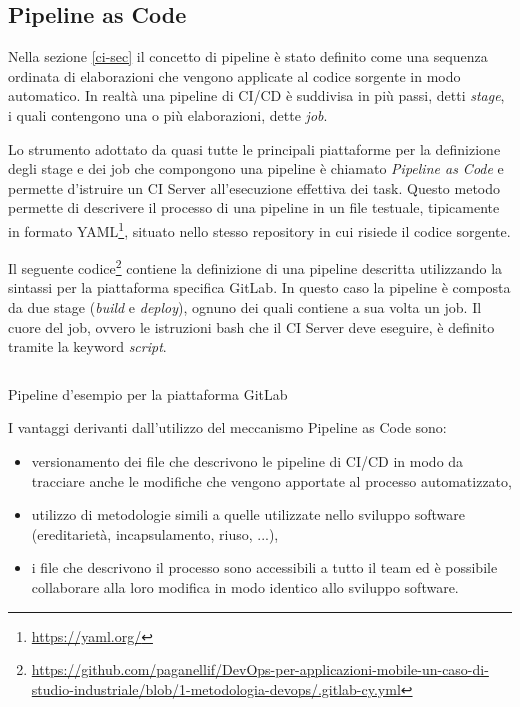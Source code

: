 \subsection{Pipeline as Code}
Nella sezione \ref{ci-sec} il concetto di pipeline è stato definito come una sequenza ordinata di elaborazioni che vengono applicate al codice sorgente in modo automatico. 
In realtà una pipeline di CI/CD è suddivisa in più passi, 
detti \textit{stage}, 
i quali contengono una o più elaborazioni, 
dette \textit{job}.

Lo strumento adottato da quasi tutte le principali piattaforme per la definizione degli stage e dei job che compongono una pipeline è chiamato \textit{Pipeline as Code} e permette d'istruire un CI Server all'esecuzione effettiva dei task. 
Questo metodo permette di descrivere il processo di una pipeline in un file testuale, 
tipicamente in formato YAML\footnote{\href{https://yaml.org/}{https://yaml.org/}}, 
situato nello stesso repository in cui risiede il codice sorgente.

Il seguente codice\footnote{\href{https://github.com/paganellif/DevOps-per-applicazioni-mobile-un-caso-di-studio-industriale/blob/1-metodologia-devops/.gitlab-cy.yml}{https://github.com/paganellif/DevOps-per-applicazioni-mobile-un-caso-di-studio-industriale/blob/1-metodologia-devops/.gitlab-cy.yml}} contiene la definizione di una pipeline descritta utilizzando la sintassi per la piattaforma specifica GitLab. 
In questo caso la pipeline è composta da due stage (\textit{build} e \textit{deploy}), 
ognuno dei quali contiene a sua volta un job. 
Il cuore del job, 
ovvero le istruzioni bash che il CI Server deve eseguire, 
è definito tramite la keyword \textit{script}.

\begin{listing}[H]
    \inputminted{yaml}{code/3-pipelineexample}
    \caption{Pipeline d'esempio per la piattaforma GitLab}
\end{listing}

I vantaggi derivanti dall'utilizzo del meccanismo Pipeline as Code sono:

\begin{itemize}
    \item versionamento dei file che descrivono le pipeline di CI/CD in modo da tracciare anche le modifiche che vengono apportate al processo automatizzato,
    
    \item utilizzo di metodologie simili a quelle utilizzate nello sviluppo software (ereditarietà, incapsulamento, riuso, ...),
    
    \item i file che descrivono il processo sono accessibili a tutto il team ed è possibile collaborare alla loro modifica in modo identico allo sviluppo software.
\end{itemize}

